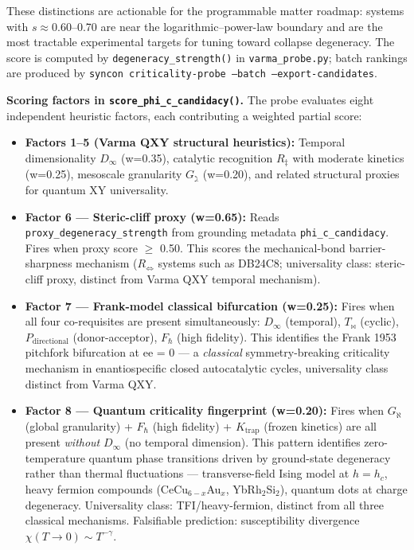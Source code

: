 \documentclass[12pt,a4paper]{article}
\begin{document}
These distinctions are actionable for the programmable matter roadmap: systems with $s \approx 0.60$--0.70 are near the logarithmic--power-law boundary and are the most tractable experimental targets for tuning toward collapse degeneracy. The score is computed by \texttt{degeneracy\_strength()} in \texttt{varma\_probe.py}; batch rankings are produced by \texttt{syncon criticality-probe --batch --export-candidates}.

\textbf{Scoring factors in \texttt{score\_phi\_c\_candidacy()}.} The probe evaluates eight independent heuristic factors, each contributing a weighted partial score:

\begin{itemize}
    \item \textbf{Factors 1--5 (Varma QXY structural heuristics):} Temporal dimensionality $D_{\infty}$ (w=0.35), catalytic recognition $R_{\ddagger}$ with moderate kinetics (w=0.25), mesoscale granularity $G_{\gimel}$ (w=0.20), and related structural proxies for quantum XY universality.
    \item \textbf{Factor 6 --- Steric-cliff proxy (w=0.65):} Reads \texttt{proxy\_degeneracy\_strength} from grounding metadata \texttt{phi\_c\_candidacy}. Fires when proxy score $\geq$ 0.50. This scores the mechanical-bond barrier-sharpness mechanism ($R_{\Leftrightarrow}$ systems such as DB24C8; universality class: steric-cliff proxy, distinct from Varma QXY temporal mechanism).
    \item \textbf{Factor 7 --- Frank-model classical bifurcation (w=0.25):} Fires when all four co-requisites are present simultaneously: $D_{\infty}$ (temporal), $T_{\bowtie}$ (cyclic), $P_{\text{directional}}$ (donor-acceptor), $F_{\hbar}$ (high fidelity). This identifies the Frank 1953 pitchfork bifurcation at ee = 0 --- a \emph{classical} symmetry-breaking criticality mechanism in enantiospecific closed autocatalytic cycles, universality class distinct from Varma QXY.
    \item \textbf{Factor 8 --- Quantum criticality fingerprint (w=0.20):} Fires when $G_{\aleph}$ (global granularity) + $F_{\hbar}$ (high fidelity) + $K_{\text{trap}}$ (frozen kinetics) are all present \emph{without} $D_{\infty}$ (no temporal dimension). This pattern identifies zero-temperature quantum phase transitions driven by ground-state degeneracy rather than thermal fluctuations --- transverse-field Ising model at $h = h_c$, heavy fermion compounds (CeCu$_{6-x}$Au$_x$, YbRh$_2$Si$_2$), quantum dots at charge degeneracy. Universality class: TFI/heavy-fermion, distinct from all three classical mechanisms. Falsifiable prediction: susceptibility divergence $\chi(T \to 0) \sim T^{-\gamma}$.
\end{itemize}
\end{document}
